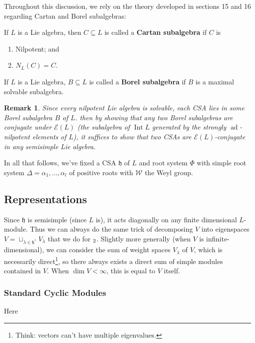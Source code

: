 \documentclass[12pt]{article}
\theoremstyle{nonumberbreak}
\theoremstyle{changebreak}
\theoremstyle{nonumberplain}
\theoremstyle{change}
\newtheorem{rmk}[thm]{Remark}
\newcommand*{\h}{\mathfrak{h}}
\let\sl\relax
\newcommand*{\sl}{\mathfrak{sl}}
\DeclareMathOperator{\ad}{ad}
\DeclareMathOperator{\Int}{Int}
\begin{document}
Throughout this discussion, we rely on the theory developed in sections 15 and 16 regarding Cartan and Borel subalgebras:
\begin{defn}
	If $L$ is a Lie algebra, then $C\subseteq L$ is called a \textbf{Cartan subalgebra} if $C$ is
	\begin{enumerate}
		\item Nilpotent; and
		\item $N_L(C)=C$.
	\end{enumerate}
\end{defn}
\begin{defn}
	If $L$ is a Lie algebra, $B\subseteq L$ is called a \textbf{Borel subalgebra} if $B$ is a
	maximal solvable subalgebra.
\end{defn}
\begin{rmk}
	Since every nilpotent Lie algebra is solvable, each CSA lies in some Borel subalgebra $B$ of $L$.
	then by showing that any two Borel subalgebras are conjugate under $\mathscr{E}(L)$ (the subalgebra of $\Int L$ generated
	by the strongly $\ad$-nilpotent elements of $L$), it suffices to 
	show that two CSAs are $\mathscr{E}(L)$-conjugate in any \textit{semisimple} Lie algebra.
\end{rmk}

In all that follows, we've fixed a CSA $\h$ of $L$ and root system $\Phi$ with simple root system $\Delta=\alpha_1,\dots,\alpha_l$
of positive roots with $\mathcal{W}$ the Weyl group.

\subsection{Representations}
Since $\h$ is semisimple (since $L$ is), it acts diagonally on any finite dimensional $L$-module. Thus we can always
do the same trick of decomposing $V$ into eigenspaces $V=\sqcup_{\lambda\in \h^*}V_\lambda$ that we do for $\sl_2$.
Slightly more generally (when $V$ is infinite-dimensional), we can consider the sum of weight spaces $V_\lambda$ of $V$, 
which is necessarily  direct\footnote{Think: vectors can't have multiple eigenvalues.}, so there always
exists a direct sum of simple modules contained in $V$. When $\dim V<\infty$, this is equal to $V$ itself.

\subsubsection{Standard Cyclic Modules}
Here
\end{document}
